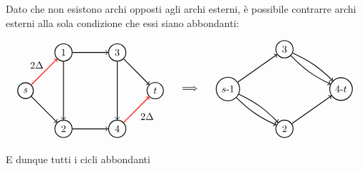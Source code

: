 \documentclass[a4paper, 11pt]{report}
\begin{document}
Dato che non esistono archi opposti agli archi esterni, è possibile contrarre archi esterni alla sola condizione che essi siano abbondanti:

\[\begin{tabular}{ccc}
    \begin{tikzpicture}[node distance={19mm}, thick , main/.style = {draw, circle}] 
    
    \node[main] (0) {$s$};
    \node[main] (1) [above right of = 0] {1};
    \node[main] (2) [below right of = 0] {2};
    \node[main] (3) [right of = 1] {3};
    \node[main] (4) [right of = 2] {4};
    \node[main] (5) [below right of = 3] {$t$};
    
    \draw[->] (0) [red] to (1);
    \draw[->] (1) to (3);
    \draw[->] (0) to (2);
    \draw[->] (2) to (4);
    \draw[->] (3) to (5);
    \draw[->] (4) [red] to (5);
    \draw[->] (1) to (2);
    \draw[->] (3) to (4);

    \node at (0.4,0.9) {$2\Delta$};
    \node at (4.3,-0.9) {$2\Delta$};

\end{tikzpicture}&\begin{tikzpicture}
    \node {$\implies$};%
    \node at (0,1.4) {};
    \node at (0,-1.6) {};
\end{tikzpicture}  &
\begin{tikzpicture}[node distance={19mm}, thick , main/.style = {draw, circle}] 
    \node[main] (0) {$s$-$1$};
    \node[main] (3) at (2,1.4) {$3$};
    \node[main] (2) at (2,-1.4) {$2$};
    \node[main] (4) at (4,0) {4-$t$};

    \draw[->] (0) to (3);
    \draw[->] (0) [bend left = 10] to (2);
    \draw[->] (0) [bend right = 10] to (2);
    
    
    \draw[->] (2) to (4);
    \draw[->] (3) [bend left = 10] to (4);
    \draw[->] (3) [bend right = 10] to (4);
    

\end{tikzpicture}
\end{tabular}\]

E dunque tutti i cicli abbondanti
\end{document}
